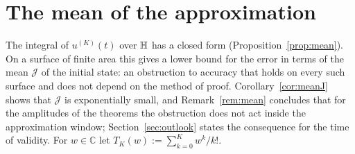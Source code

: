\section{The mean of the approximation}\label{sec:g5}\label{subsec:mean}
The integral of $u^{(K)}(t)$ over $\mathbb{H}$ has a closed form (Proposition~\ref{prop:mean}). On a surface of finite area this
gives a lower bound for the error in terms of the mean $\mathcal J$ of the initial state: an obstruction to accuracy that holds on
every such surface and does not depend on the method of proof. Corollary~\ref{cor:meanJ} shows that $\mathcal J$ is exponentially
small, and Remark~\ref{rem:mean} concludes that for the amplitudes of the theorems the obstruction does not act inside the
approximation window; Section~\ref{sec:outlook} states the consequence for the time of validity. For $w\in\mathbb C$ let
$T_K(w):=\sum_{k=0}^{K}w^k/k!$.

